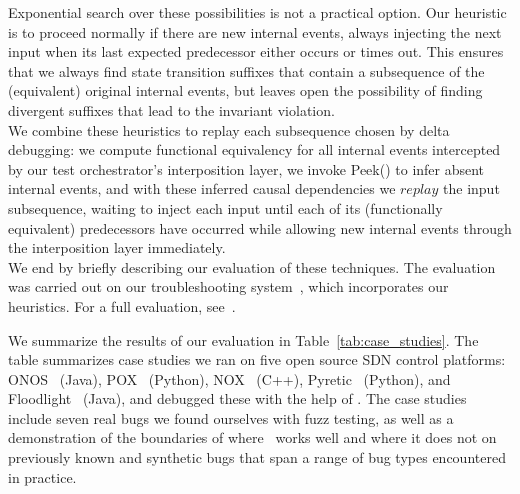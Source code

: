 

Exponential search over these possibilities is not a practical option. Our heuristic
is to proceed normally if there are new internal events,
always injecting the next input when its last expected predecessor
either occurs or times out. This ensures that we always find state transition suffixes that
contain a subsequence of the (equivalent) original internal events, but leaves open the
possibility of finding divergent suffixes that lead to the invariant
violation.\\[0.5ex]
%
%
 We combine these heuristics to replay each
subsequence chosen by delta debugging: we compute functional equivalency
for all internal events intercepted by our test orchestrator's
interposition layer, we invoke {\sc Peek()} to infer absent internal events,
and with these inferred causal dependencies we $replay$
the input subsequence, waiting to inject each input until each of its
(functionally equivalent) predecessors have occurred while allowing
new internal events through the interposition layer immediately.\\[0.5ex]
%
 We end by briefly describing our evaluation of these
techniques. The evaluation was carried out on our troubleshooting
system~\projectname, which incorporates our heuristics. For a full evaluation, see~\cite{sts2014}.

We summarize the results of our evaluation in Table~\ref{tab:case_studies}.
The table summarizes case studies we ran on
five open source SDN control platforms:
ONOS~\cite{ONOS} (Java), POX~\cite{pox} (Python), NOX~\cite{nox} (C++),
Pyretic~\cite{frenetic} (Python), and Floodlight~\cite{floodlight} (Java), and
debugged these with the help of \projectname. The case studies include seven
real bugs we found ourselves with fuzz testing, as well as a demonstration of the
boundaries of where \projectname~works well and where it does not on
previously known and synthetic bugs that span a range of bug types
encountered in practice.

